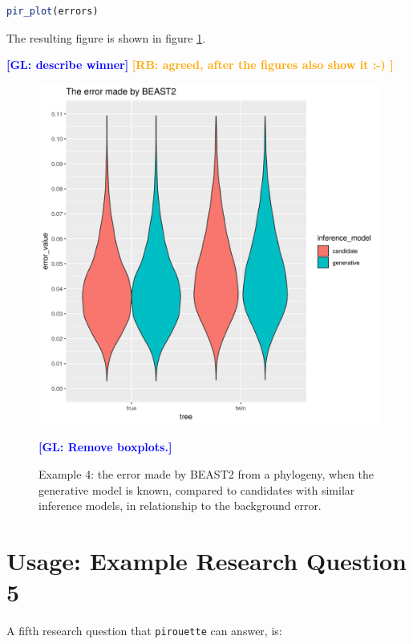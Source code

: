\documentclass{article}
\newcommand{\giovanni}[1]{\textcolor{blue}{\textbf{[GL: #1]}}}
\newcommand{\richel}[1]{\textcolor{orange}{\textbf{[RB: #1]}}}
\begin{document}
\begin{lstlisting}[language=R, floatplacement=ht, frame=single]
pir_plot(errors)
\end{lstlisting}

The resulting figure is shown in figure \ref{fig:example_4}.

\giovanni{describe winner}
\richel{agreed, after the figures also show it :-) }

\begin{figure}[ht]
  \includegraphics[width=\textwidth]{example_4_errors.png}
  \caption{
    Example 4: the error made by BEAST2 from a phylogeny, when the generative model is known, compared to candidates with similar inference models, in relationship to the background error.
  }
  \label{fig:example_4}
  \giovanni{Remove boxplots.}
\end{figure}


\section{Usage: Example Research Question 5}

A fifth research question that \verb;pirouette; can answer, is:
\end{document}
